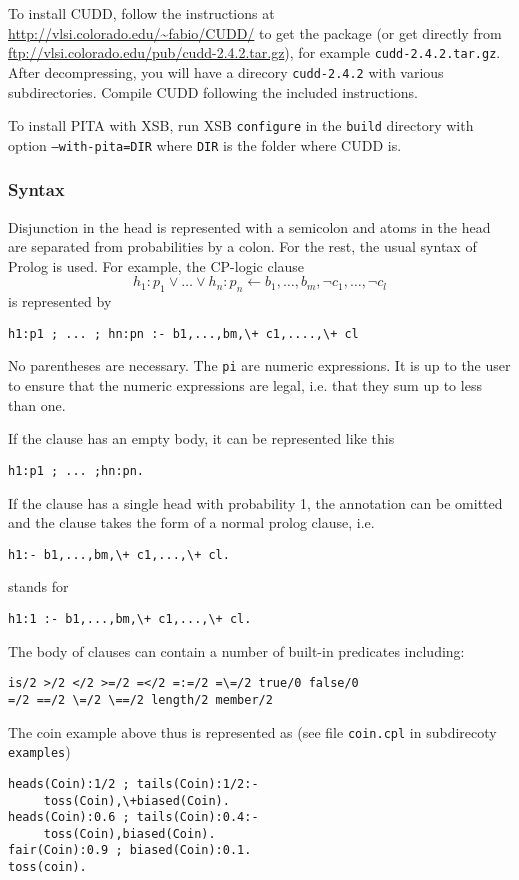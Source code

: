 To install CUDD, follow the instructions at  \url{http://vlsi.colorado.edu/~fabio/CUDD/} to get the package (or get directly from \url{ftp://vlsi.colorado.edu/pub/cudd-2.4.2.tar.gz}), for example \texttt{cudd-2.4.2.tar.gz}.
After decompressing, you will have a direcory \texttt{cudd-2.4.2} with various subdirectories.
Compile CUDD following the included instructions.

To install PITA with XSB, run XSB \texttt{configure} in the \texttt{build} directory with option \texttt{--with-pita=DIR} where \texttt{DIR} is the folder where CUDD is.


\subsubsection{Syntax}

Disjunction in the head is represented with a semicolon and atoms in the head are separated from probabilities by a colon. For the rest, the usual syntax of Prolog is used.
For example, the  CP-logic clause
$$h_1:p_1\vee \ldots \vee h_n:p_n\leftarrow b_1,\dots,b_m ,\neg c_1,\ldots,\neg c_l$$
is represented by
\begin{verbatim}
h1:p1 ; ... ; hn:pn :- b1,...,bm,\+ c1,....,\+ cl
\end{verbatim}
 No parentheses are necessary. The \texttt{pi} are numeric expressions. It is up to the user to ensure that the numeric expressions are legal, i.e. that they sum up to less than one.

If the clause has an empty body, it can be represented like this
\begin{verbatim}
h1:p1 ; ... ;hn:pn.
\end{verbatim}
If the clause has a single head with probability 1, the annotation can be omitted and the clause takes the form of a normal prolog clause, i.e. 
\begin{verbatim}
h1:- b1,...,bm,\+ c1,...,\+ cl.
\end{verbatim}
stands for 
\begin{verbatim}
h1:1 :- b1,...,bm,\+ c1,...,\+ cl.
\end{verbatim}



The body of clauses can contain a number of built-in predicates including:
\begin{verbatim}
is/2 >/2 </2 >=/2 =</2 =:=/2 =\=/2 true/0 false/0
=/2 ==/2 \=/2 \==/2 length/2 member/2
\end{verbatim}
The coin example above thus is represented as (see file \texttt{coin.cpl} in subdirecoty \texttt{examples})
\begin{verbatim}
heads(Coin):1/2 ; tails(Coin):1/2:- 
     toss(Coin),\+biased(Coin).
heads(Coin):0.6 ; tails(Coin):0.4:- 
     toss(Coin),biased(Coin).
fair(Coin):0.9 ; biased(Coin):0.1.
toss(coin).
\end{verbatim}

